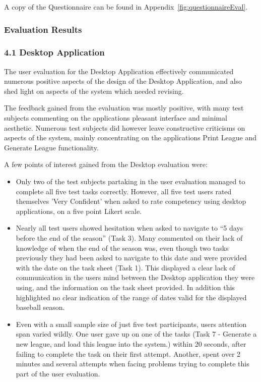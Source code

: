 A copy of the Questionnaire can be found in
Appendix~\ref{fig:questionnaireEval}.

\subsubsection{Evaluation Results}

\subsubsection{4.1 Desktop Application}

The user evaluation for the Desktop Application effectively communicated
numerous positive aspects of the design of the Desktop Application, and also
shed light on aspects of the system which needed revising.

The feedback gained from the evaluation was mostly positive, with many test
subjects commenting on the applications pleasant interface and minimal
aesthetic. Numerous test subjects did however leave constructive criticisms on
aspects of the system, mainly concentrating on the applications Print League
and Generate League functionality.

A few points of interest gained from the Desktop evaluation were:

\begin{itemize}
\item Only two of the test subjects partaking in the user evaluation managed to
complete all five test tasks correctly. However, all five test users rated
themselves 'Very Confident' when asked to rate competency using desktop
applications, on a five point Likert scale.
\item Nearly all test users showed hesitation when asked to navigate to ``5
days before the end of the season'' (Task 3). Many commented on their lack of
knowledge of when the end of the season was, even though two tasks previously
they had been asked to navigate to this date and were provided with the date on
the task sheet (Task 1). This displayed a clear lack of communication in the
users mind between the Desktop application they were using, and the information
on the task sheet provided. In addition this highlighted no clear indication of
the range of dates valid for the displayed baseball season.
\item Even with a small sample size of just five test participants, users
attention span varied wildly. One user gave up on one of the tasks (Task 7 -
Generate a new league, and load this league into the system.) within 20
seconds, after failing to complete the task on their first attempt. Another,
spent over 2 minutes and several attempts when facing problems trying to
complete this part of the user evaluation.
\end{itemize}

